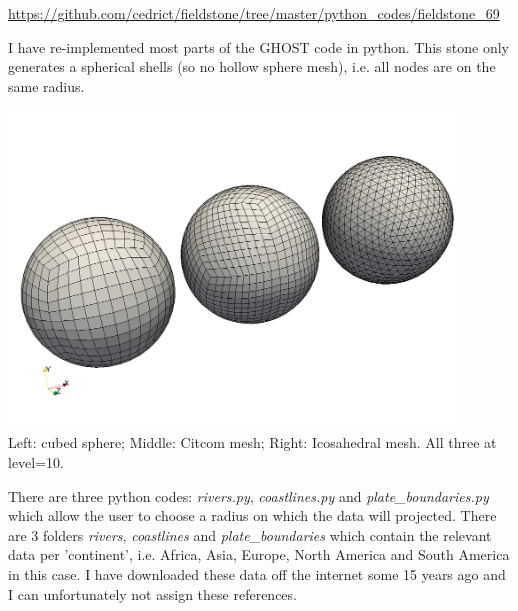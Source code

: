 
\url{https://github.com/cedrict/fieldstone/tree/master/python_codes/fieldstone_69}



I have re-implemented most parts of the GHOST code \cite{thie18} in python. 
This stone only generates a spherical shells (so no hollow sphere mesh), 
i.e. all nodes are on the same radius. 

\begin{center}
\includegraphics[width=12cm]{python_codes/fieldstone_69/images/shells}\\
{\captionfont Left: cubed sphere; Middle: Citcom mesh; Right: Icosahedral mesh. 
All three at level=10.}
\end{center}



There are three python codes: {\sl rivers.py}, {\sl coastlines.py} and {\sl plate\_boundaries.py} which allow the user to choose 
a radius on which the data will projected. There are 3 folders {\sl rivers}, {\sl coastlines} and {\sl plate\_boundaries} which contain the relevant data per 'continent', i.e. 
Africa, Asia, Europe, North America and South America in this case. 
I have downloaded these data off the internet some 15 years ago and I can unfortunately not assign these references.

